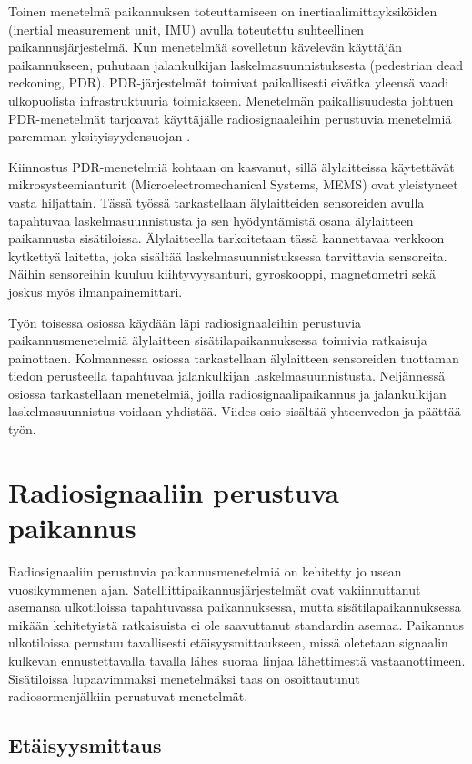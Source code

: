 Toinen menetelmä paikannuksen toteuttamiseen on inertiaalimittayksiköiden
(inertial measurement unit, IMU) avulla toteutettu suhteellinen
paikannusjärjestelmä. Kun menetelmää sovelletun kävelevän käyttäjän
paikannukseen, puhutaan jalankulkijan laskelmasuunnistuksesta (pedestrian dead
reckoning, PDR). PDR-järjestelmät toimivat paikallisesti eivätka yleensä vaadi
ulkopuolista infrastruktuuria toimiakseen.  Menetelmän paikallisuudesta johtuen
PDR-menetelmät tarjoavat käyttäjälle radiosignaaleihin perustuvia menetelmiä
paremman yksityisyydensuojan \cite{harle2013}.

Kiinnostus PDR-menetelmiä kohtaan on kasvanut, sillä älylaitteissa käytettävät
mikrosysteemianturit (Microelectromechanical Systems, MEMS) ovat yleistyneet
vasta hiljattain. Tässä työssä tarkastellaan älylaitteiden sensoreiden avulla
tapahtuvaa laskelmasuunnistusta ja sen hyödyntämistä osana älylaitteen
paikannusta sisätiloissa.  Älylaitteella tarkoitetaan tässä kannettavaa
verkkoon kytkettyä laitetta, joka sisältää laskelmasuunnistuksessa tarvittavia
sensoreita. Näihin sensoreihin kuuluu kiihtyvyysanturi, gyroskooppi,
magnetometri sekä joskus myös ilmanpainemittari.

Työn toisessa osiossa käydään läpi radiosignaaleihin perustuvia
paikannusmenetelmiä älylaitteen sisätilapaikannuksessa toimivia ratkaisuja
painottaen. Kolmannessa osiossa tarkastellaan älylaitteen sensoreiden tuottaman
tiedon perusteella tapahtuvaa jalankulkijan laskelmasuunnistusta. Neljännessä
osiossa tarkastellaan menetelmiä, joilla radiosignaalipaikannus ja
jalankulkijan laskelmasuunnistus voidaan yhdistää.  Viides osio sisältää
yhteenvedon ja päättää työn.

\section{Radiosignaaliin perustuva paikannus}

Radiosignaaliin perustuvia paikannusmenetelmiä on kehitetty jo usean
vuosikymmenen ajan. Satelliittipaikannusjärjestelmät ovat vakiinnuttanut
asemansa ulkotiloissa tapahtuvassa paikannuksessa, mutta sisätilapaikannuksessa
mikään kehitetyistä ratkaisuista ei ole saavuttanut standardin asemaa.
Paikannus ulkotiloissa perustuu tavallisesti etäisyysmittaukseen, missä
oletetaan signaalin kulkevan ennustettavalla tavalla lähes suoraa linjaa
lähettimestä vastaanottimeen.  Sisätiloissa lupaavimmaksi menetelmäksi taas on
osoittautunut radiosormenjälkiin perustuvat menetelmät.

\subsection{Etäisyysmittaus}

